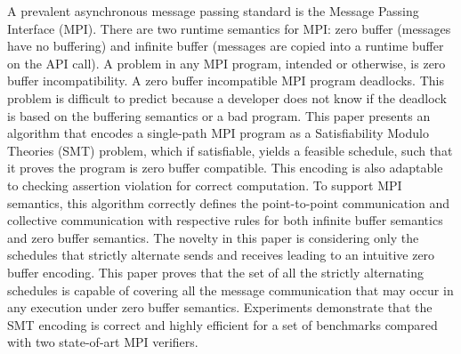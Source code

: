 %
A prevalent asynchronous message passing standard is the Message Passing Interface (MPI). 
%
There are two runtime semantics for MPI: zero buffer (messages have no buffering) and infinite buffer (messages are copied into a runtime buffer on the API call).
%
A problem in any MPI program, intended or otherwise, is zero buffer incompatibility. A zero buffer incompatible MPI program deadlocks.
%
This problem is difficult to predict because a developer does not know if the deadlock is based on the buffering semantics or a bad program. 
%
This paper presents an algorithm that encodes a single-path MPI program as a Satisfiability Modulo Theories (SMT) problem, which if satisfiable, yields a feasible schedule, such that it proves the program is zero buffer compatible. This encoding is also adaptable to checking assertion violation for correct computation.
%
To support MPI semantics, this algorithm correctly defines the point-to-point communication and collective communication with respective rules for both infinite buffer semantics and zero buffer semantics. 
%
The novelty in this paper is considering only the schedules that strictly alternate sends and receives leading to an intuitive zero buffer encoding.
%
This paper proves that the set of all the strictly alternating schedules is capable of covering all the message communication that may occur in any execution under zero buffer semantics. 
%
Experiments demonstrate that the SMT encoding is correct and highly efficient for a set of benchmarks compared with two state-of-art MPI verifiers. 
%
